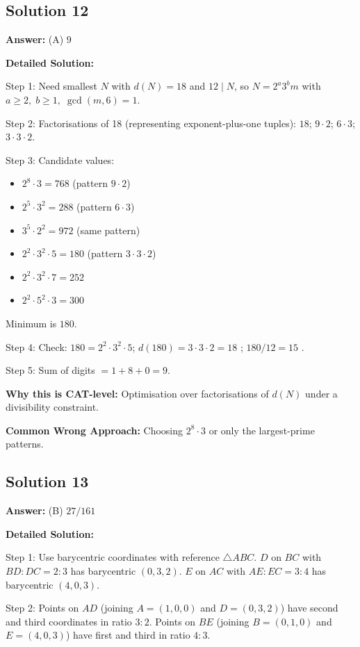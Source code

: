 \documentclass[11pt]{article}
\begin{document}
\subsection*{Solution 12}

\textbf{Answer:} (A) \(9\)

\textbf{Detailed Solution:}

Step 1: Need smallest \(N\) with \(d(N)=18\) and \(12\mid N\), so \(N = 2^a 3^b m\) with \(a\ge 2,\;b\ge 1,\;\gcd(m,6)=1\).

Step 2: Factorisations of 18 (representing exponent-plus-one tuples): \(18\); \(9\cdot 2\); \(6\cdot 3\); \(3\cdot 3\cdot 2\).

Step 3: Candidate values:
\begin{itemize}
\item \(2^8\cdot 3 = 768\) (pattern \(9\cdot 2\))
\item \(2^5\cdot 3^2 = 288\) (pattern \(6\cdot 3\))
\item \(3^5\cdot 2^2 = 972\) (same pattern)
\item \(2^2\cdot 3^2\cdot 5 = 180\) (pattern \(3\cdot 3\cdot 2\))
\item \(2^2\cdot 3^2\cdot 7 = 252\)
\item \(2^2\cdot 5^2\cdot 3 = 300\)
\end{itemize}
Minimum is \(180\).

Step 4: Check: \(180 = 2^2\cdot 3^2\cdot 5\); \(d(180) = 3\cdot 3\cdot 2 = 18\) \checkmark; \(180/12 = 15\) \checkmark.

Step 5: Sum of digits \(=1+8+0 = 9\).

\textbf{Why this is CAT-level:} Optimisation over factorisations of \(d(N)\) under a divisibility constraint.

\textbf{Common Wrong Approach:} Choosing \(2^8\cdot 3\) or only the largest-prime patterns.

\subsection*{Solution 13}

\textbf{Answer:} (B) \(27/161\)

\textbf{Detailed Solution:}

Step 1: Use barycentric coordinates with reference \(\triangle ABC\). 
\(D\) on \(BC\) with \(BD:DC=2:3\) has barycentric \((0,3,2)\).
\(E\) on \(AC\) with \(AE:EC=3:4\) has barycentric \((4,0,3)\).

Step 2: Points on \(AD\) (joining \(A=(1,0,0)\) and \(D=(0,3,2)\)) have second and third coordinates in ratio \(3:2\). Points on \(BE\) (joining \(B=(0,1,0)\) and \(E=(4,0,3)\)) have first and third in ratio \(4:3\).
\end{document}
